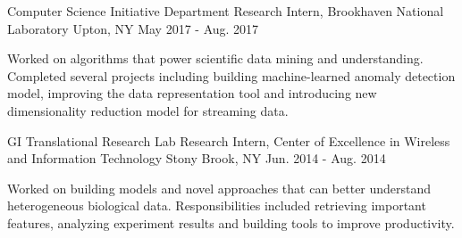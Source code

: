 


\begin{cventries}


\cventry
{Computer Science Initiative Department} %
{Research Intern, Brookhaven National Laboratory} %
{Upton, NY} %
{May 2017 - Aug. 2017} %
{ %
\begin{cvitems}
\item{Worked on algorithms that power scientific data mining and understanding. Completed several projects including building machine-learned anomaly detection model, improving the data representation tool and introducing new dimensionality reduction model for streaming data.}
\end{cvitems}
}


\cventry
{GI Translational Research Lab} %
{Research Intern, Center of Excellence in Wireless and Information Technology} %
{Stony Brook, NY} %
{Jun. 2014 - Aug. 2014} %
{ %
\begin{cvitems}
\item{ Worked on building models and novel approaches that can better understand heterogeneous biological data. Responsibilities included retrieving important features, analyzing experiment results and building tools to improve productivity.}
\end{cvitems}
}



\end{cventries}
